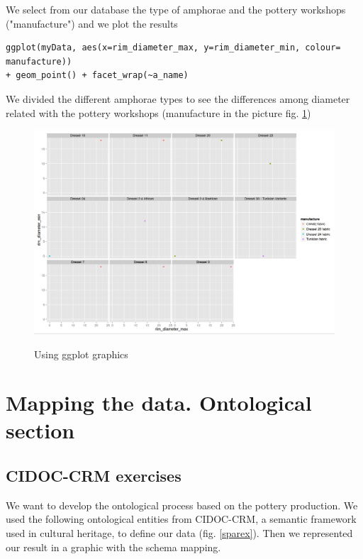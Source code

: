 \documentclass[10pt,a4paper]{article}
\begin{document}
We select from our database the type of amphorae and the pottery workshops ("manufacture") and we plot the results 

\begin{verbatim}
ggplot(myData, aes(x=rim_diameter_max, y=rim_diameter_min, colour= manufacture)) 
+ geom_point() + facet_wrap(~a_name)
\end{verbatim}

We divided the different amphorae types to see the differences among diameter related with the pottery workshops (manufacture in the picture fig. \ref{ggplotex})


\begin{figure}[hdp]
\centering
\includegraphics[scale=0.45]{ggplot2ex.png}
\label{ggplotex}
\caption{Using ggplot graphics}
\end{figure}


\section{Mapping the data. Ontological section}

\subsection{CIDOC-CRM exercises}

We want to develop the ontological process based on the pottery production. We used the following ontological entities from CIDOC-CRM, a semantic framework used in cultural heritage, to define our data (fig. \ref{sparex}). Then we represented our result in a graphic with the schema mapping. 
\end{document}
